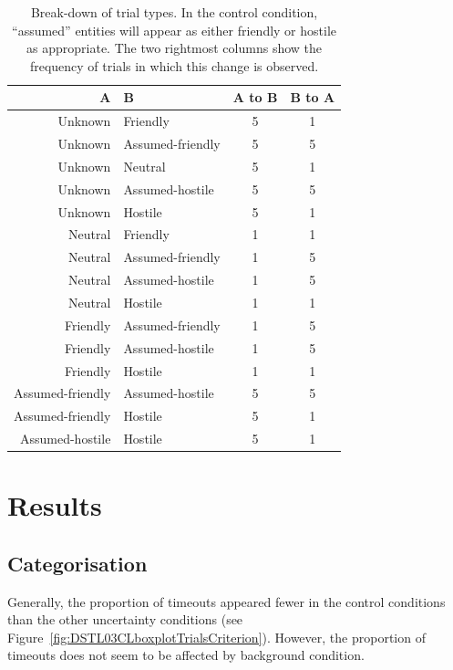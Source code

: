\documentclass[doc, a4paper, apacite]{apa6}
\begin{document}
\begin{table}[t!]
	\centering
	\caption{Break-down of trial types. In the control condition, ``assumed'' entities will appear as either friendly or hostile as appropriate. The two rightmost columns show the frequency of trials in which this change is observed.} \label{table:trialTypes}
	\begin{tabular}{r l c c}
		\toprule
		A & B & A to B & B to A \\
		\midrule
		Unknown & Friendly & 5 & 1\\
		Unknown & Assumed-friendly & 5 & 5\\
		Unknown & Neutral & 5 & 1 \\
		Unknown & Assumed-hostile & 5 &5\\
		Unknown & Hostile & 5 & 1 \\
		Neutral & Friendly & 1 &1\\
		Neutral & Assumed-friendly &1 &5\\
		Neutral & Assumed-hostile &1 &5\\
		Neutral & Hostile &1 &1\\
		Friendly & Assumed-friendly &1 & 5\\
		Friendly & Assumed-hostile & 1 & 5 \\
		Friendly & Hostile & 1&1\\
		Assumed-friendly & Assumed-hostile & 5 &5\\
		Assumed-friendly & Hostile &5 & 1\\
		Assumed-hostile & Hostile & 5&1\\
		\bottomrule 
	\end{tabular}
\end{table}

\section{Results}
\subsection{Categorisation}
Generally, the proportion of timeouts appeared fewer in the control conditions than the other uncertainty conditions (see Figure~\ref{fig:DSTL03CLboxplotTrialsCriterion}). 
However, the proportion of timeouts does not seem to be affected by background condition. 
\end{document}

